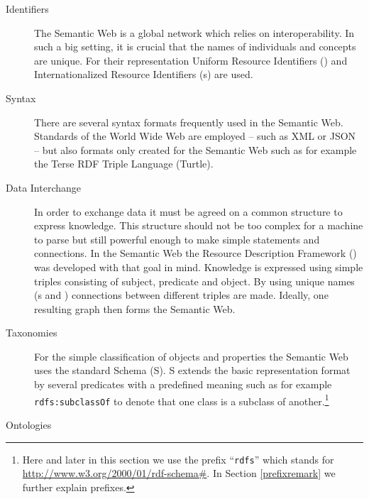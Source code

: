 \begin{description}
 \item[Identifiers] The Semantic Web is a global network which relies on interoperability. In such a big setting, it is crucial that the names of individuals and concepts are unique.
 For their representation Uniform Resource Identifiers (\uris) and Internationalized Resource Identifiers (\iri{}s) are used.  
 \item[Syntax] There are several syntax formats frequently used in the Semantic Web. Standards of the World Wide Web are employed -- such as XML or JSON -- but also formats 
 only created for the Semantic Web such as for example the Terse RDF Triple Language (Turtle). 
 \item[Data Interchange]
In order to exchange data it must be agreed on  a common structure to express knowledge. This 
structure should not be too complex for a machine to parse but still 
powerful enough to make simple statements and connections. 
In the Semantic Web the Resource Description Framework (\rdf) was developed with 
that goal in mind. Knowledge is expressed using simple triples consisting of subject,
predicate and object. By using unique names (\iri{}s and \uris) connections between different triples are made. 
Ideally, one resulting graph then forms the Semantic Web.
 \item[Taxonomies] For the simple classification of objects and properties the Semantic Web uses the standard \rdf Schema (\rdf{}S). \rdf{}S extends the basic representation format 
 \rdf by several predicates with a predefined meaning such as for example \texttt{rdfs:subclassOf} to denote that one class is a subclass of another.\footnote{
Here and later in this section we use the prefix 
``\texttt{rdfs}'' which stands for  \url{http://www.w3.org/2000/01/rdf-schema\#}.
In Section \ref{prefixremark} we further explain prefixes.
 } 
 \item[Ontologies]

\end{description}

